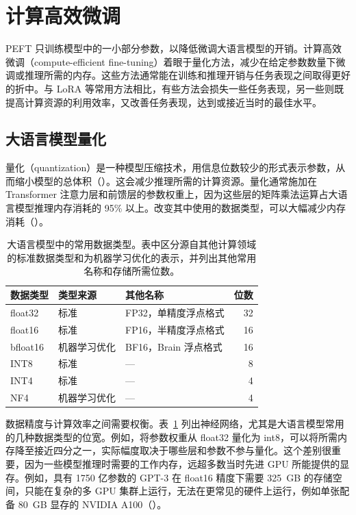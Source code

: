 \section{计算高效微调}
\label{sec:ch04-compute-efficient}
PEFT 只训练模型中的一小部分参数，以降低微调大语言模型的开销。计算高效微调（compute-efficient fine-tuning）着眼于量化方法，减少在给定参数数量下微调或推理所需的内存。这些方法通常能在训练和推理开销与任务表现之间取得更好的折中。与 LoRA 等常用方法相比，有些方法会损失一些任务表现，另一些则既提高计算资源的利用效率，又改善任务表现，达到或接近当时的最佳水平。

\subsection{大语言模型量化}
\label{sec:ch04-quantization}
量化（quantization）是一种模型压缩技术，用信息位数较少的形式表示参数，从而缩小模型的总体积（）。这会减少推理所需的计算资源。量化通常施加在 Transformer 注意力层和前馈层的参数权重上，因为这些层的矩阵乘法运算占大语言模型推理内存消耗的 95\% 以上。改变其中使用的数据类型，可以大幅减少内存消耗（）。

\begin{table}[!htbp]
\centering
\caption{大语言模型中的常用数据类型。表中区分源自其他计算领域的标准数据类型和为机器学习优化的表示，并列出其他常用名称和存储所需位数。}
\label{tab:ch04-types}
\small
\begin{tabularx}{\linewidth}{@{}l l X r@{}}
\toprule
数据类型 & 类型来源 & 其他名称 & 位数\\
\midrule
float32 & 标准 & FP32，单精度浮点格式 & 32\\
float16 & 标准 & FP16，半精度浮点格式 & 16\\
bfloat16 & 机器学习优化 & BF16，Brain 浮点格式 & 16\\
INT8 & 标准 & — & 8\\
INT4 & 标准 & — & 4\\
NF4 & 机器学习优化 & — & 4\\
\bottomrule
\end{tabularx}
\end{table}

数据精度与计算效率之间需要权衡。表~\ref{tab:ch04-types} 列出神经网络，尤其是大语言模型常用的几种数据类型的位宽。例如，将参数权重从 float32 量化为 int8，可以将所需内存降至接近四分之一，实际幅度取决于哪些层和参数不参与量化。这个差别很重要，因为一些模型推理时需要的工作内存，远超多数当时先进 GPU 所能提供的显存。例如，具有 1750 亿参数的 GPT-3 在 float16 精度下需要 325~GB 的存储空间，只能在复杂的多 GPU 集群上运行，无法在更常见的硬件上运行，例如单张配备 80~GB 显存的 NVIDIA A100（）。

